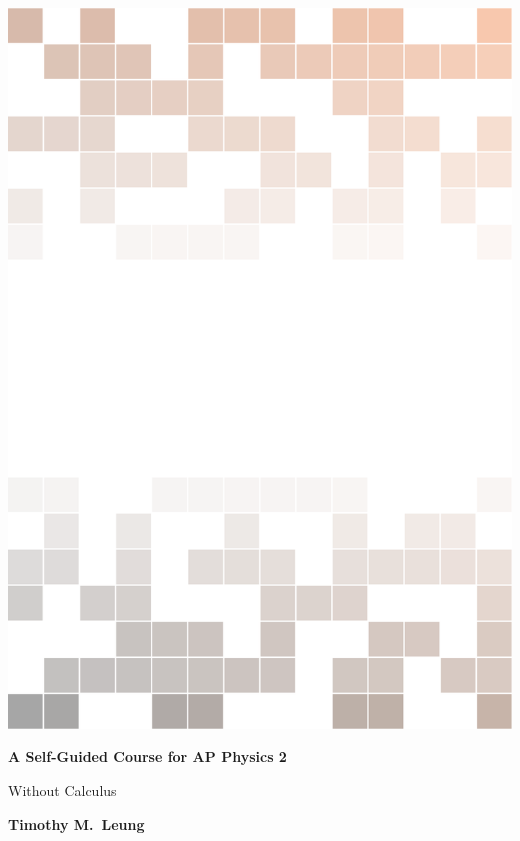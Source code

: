 \documentclass[
  12pt, %
  letterpaper,
]{LegrandOrangeBook}
\begin{document}

\titlepage %
    {\includegraphics[width=\paperwidth]{background.pdf}} %
    { %
      \centering\sffamily %
	  {\Huge\bfseries A Self-Guided Course for AP Physics 2\par}
	  \vspace{16pt} %
		 {\LARGE Without Calculus\par} %
		 \vspace{24pt} %
		        {\huge\bfseries Timothy M.\ Leung\par} %
    }
    
\end{document}
